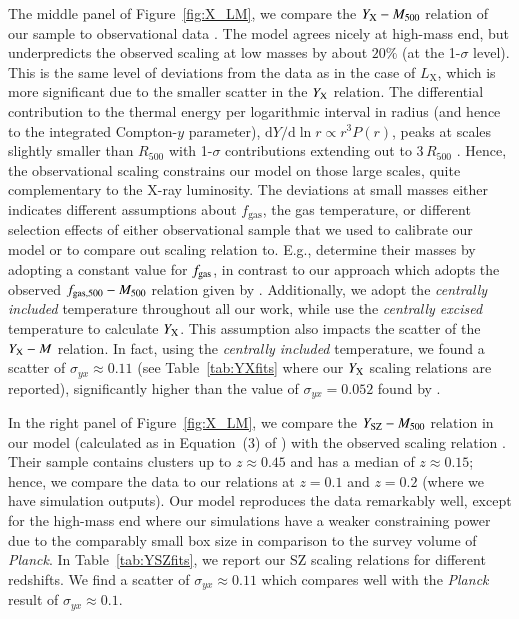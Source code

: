 \documentclass[traditabstract]{aa}
\newcommand{\rmn}{\mathrm}
\newcommand{\dd}{\mathrm{d}}
\begin{document}
The middle panel of Figure~\ref{fig:X_LM}, we compare the $Y_{\rm{X}}-M_{500}$
relation of our sample to observational data \citep{2010MNRAS.406.1773M}. The
model agrees nicely at high-mass end, but underpredicts the observed scaling at
low masses by about $20\%$ (at the 1-$\sigma$ level). This is the same level of
deviations from the data as in the case of $L_{\rmn{X}}$, which is more
significant due to the smaller scatter in the $Y_{\rm{X}}$ relation. The
differential contribution to the thermal energy per logarithmic interval in
radius (and hence to the integrated Compton-$y$ parameter), $\dd Y /\dd\ln r
\propto r^3 P(r)$, peaks at scales slightly smaller than $R_{500}$ with
1-$\sigma$ contributions extending out to $3\,R_{500}$
\citep{2010ApJ...725...91B}. Hence, the observational scaling constrains our
model on those large scales, quite complementary to the X-ray luminosity. The
deviations at small masses either indicates different assumptions about
$f_{\rmn{gas}}$, the gas temperature, or different selection effects of either
observational sample that we used to calibrate our model or to compare out
scaling relation to. E.g., \cite{2010MNRAS.406.1773M} determine their masses by
adopting a constant value for $f_{\rm{gas}}$, in contrast to our approach which
adopts the observed $f_{\rm{gas},500}-M_{500}$ relation given by
\cite{2009ApJ...693.1142S}. Additionally, we adopt the \emph{centrally included}
temperature \cite{2010MNRAS.406.1773M} throughout all our work, while
\cite{2010MNRAS.406.1773M} use the \emph{centrally excised} temperature to
calculate $Y_{\rm{X}}$. This assumption also impacts the scatter of the
$Y_{\rm{X}}-M$ relation. In fact, using the \emph{centrally included}
temperature, we found a scatter of $\sigma_{yx} \approx 0.11$ (see
Table~\ref{tab:YXfits} where our $Y_{\rm{X}}$ scaling relations are reported),
significantly higher than the value of $\sigma_{yx} = 0.052$ found by
\cite{2010MNRAS.406.1773M}.

In the right panel of Figure~\ref{fig:X_LM}, we compare the
$Y_{\rm{SZ}}-M_{500}$ relation in our model (calculated as in Equation~(3) of
\cite{2011arXiv1109.3709B}) with the observed scaling relation
\cite{2011A&A...536A..11P}. Their sample contains clusters up to $z \approx
0.45$ and has a median of $z \approx 0.15$; hence, we compare the data to our
relations at $z=0.1$ and $z=0.2$ (where we have simulation outputs). Our model
reproduces the data remarkably well, except for the high-mass end where our
simulations have a weaker constraining power due to the comparably small box size
in comparison to the survey volume of {\em Planck}. In Table~\ref{tab:YSZfits},
we report our SZ scaling relations for different redshifts. We find a scatter
of $\sigma_{yx} \approx 0.11$ which compares well with the \emph{Planck} result
of $\sigma_{yx} \approx 0.1$.
 
\end{document}
